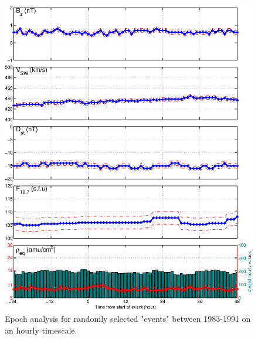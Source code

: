 \begin{figure}[htp!]
	\centering
	\includegraphics[width=1\linewidth]{Figures/StormAvs/stormavs-random-GOES6}
	\caption{Epoch analysis for randomly selected "events" between 1983-1991 on an hourly timescale.}
	\label{fig:EpochRandom}
\end{figure}

